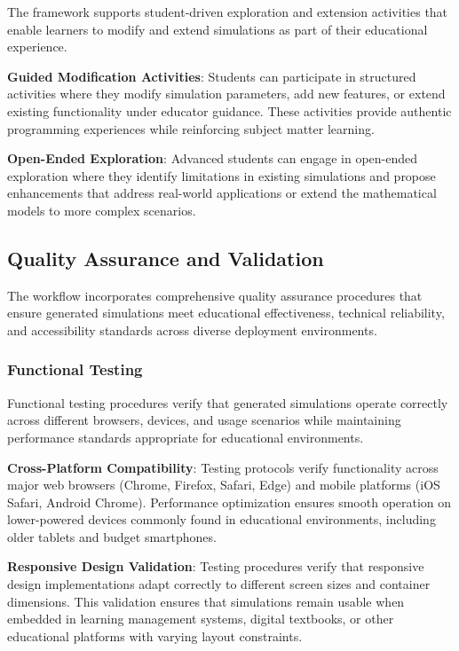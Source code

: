 The framework supports student-driven exploration and extension activities that enable learners to modify and extend simulations as part of their educational experience.

\textbf{Guided Modification Activities}: Students can participate in structured activities where they modify simulation parameters, add new features, or extend existing functionality under educator guidance. These activities provide authentic programming experiences while reinforcing subject matter learning.

\textbf{Open-Ended Exploration}: Advanced students can engage in open-ended exploration where they identify limitations in existing simulations and propose enhancements that address real-world applications or extend the mathematical models to more complex scenarios.

\subsection{Quality Assurance and Validation}

The workflow incorporates comprehensive quality assurance procedures that ensure generated simulations meet educational effectiveness, technical reliability, and accessibility standards across diverse deployment environments.

\subsubsection{Functional Testing}

Functional testing procedures verify that generated simulations operate correctly across different browsers, devices, and usage scenarios while maintaining performance standards appropriate for educational environments.

\textbf{Cross-Platform Compatibility}: Testing protocols verify functionality across major web browsers (Chrome, Firefox, Safari, Edge) and mobile platforms (iOS Safari, Android Chrome). Performance optimization ensures smooth operation on lower-powered devices commonly found in educational environments, including older tablets and budget smartphones.

\textbf{Responsive Design Validation}: Testing procedures verify that responsive design implementations adapt correctly to different screen sizes and container dimensions. This validation ensures that simulations remain usable when embedded in learning management systems, digital textbooks, or other educational platforms with varying layout constraints.

